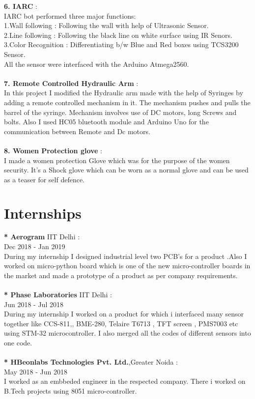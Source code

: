 \documentclass[11pt]{article}
\begin{document}
\textbf{6. IARC} :\\
IARC bot performed three major functions:\\
1.Wall following : Following the wall with help of Ultrasonic Sensor.\\
2.Line following : Following the black line on white surface using IR Senors.\\
3.Color Recognition :  Differentiating b/w Blue and Red boxes using TCS3200 Sensor.\\                                     
All the sensor were interfaced with the Arduino Atmega2560.\\\\
\textbf{7. Remote Controlled Hydraulic Arm} :\\
In this project I modified the Hydraulic arm made with the help of Syringes by adding a remote controlled mechanism in it. The mechanism pushes and pulls the barrel of the syringe. Mechanism involves use of DC motors, long Screws and bolts. Also I used HC05 bluetooth module and Arduino Uno for the communication between Remote and Dc motors.\\\\
\textbf{8. Women Protection glove} :\\
I made a women protection Glove which was for the purpose of the women security.
It's a Shock glove which can be worn as a normal glove and can be used as a teaser for self defence.\\

\section{Internships} 
\textbf{* Aerogram} IIT Delhi :\\
Dec 2018 - Jan 2019\\
During my internship I designed industrial level two PCB's for a product .Also I worked on micro-python board which is one of the new micro-controller boards in the market and made a prototype of a product as per company requirements. \\\\
\textbf{* Phase Laboratories} IIT Delhi :\\
Jun 2018 - Jul 2018\\
During my internship I worked on a product for which i interfaced many sensor together like CCS-811,, BME-280, Telaire T6713 , TFT screen , PMS7003 etc using STM-32 microcontroller. I also merged all the codes of different sensors into one code.\\\\
\textbf{* HBeonlabs Technologies Pvt. Ltd.},Greater Noida :\\ 
May 2018 - Jun 2018\\
I worked as an embbeded engineer in the respected company. There i worked on B.Tech projects using 8051 micro-controller.
\end{document}
